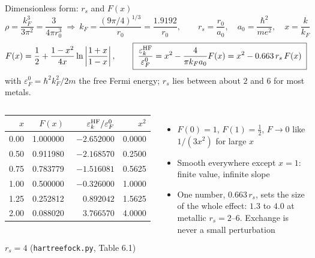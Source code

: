 \documentclass[aspectratio=169,10pt]{beamer}
\begin{document}
\begin{frame}{Dimensionless form: $r_s$ and $F(x)$}
  \small
  \[
    \rho=\frac{k_F^3}{3\pi^2}=\frac{3}{4\pi r_0^3}\ \Rightarrow\ k_F=\frac{(9\pi/4)^{1/3}}{r_0}=\frac{1.9192}{r_0},
    \qquad r_s=\frac{r_0}{a_0},\quad a_0=\frac{\hbar^2}{me^2},\quad x=\frac{k}{k_F}
  \]
  \vspace{-1.0em}
  \[
    F(x)=\frac12+\frac{1-x^2}{4x}\ln\left|\frac{1+x}{1-x}\right|,
    \qquad
    \boxed{\;\frac{\varepsilon_k^{\rm HF}}{\varepsilon_F^0}=x^2-\frac{4}{\pi k_Fa_0}F(x)=x^2-0.663\,r_s\,F(x)\;}
  \]
  with $\varepsilon_F^0=\hbar^2k_F^2/2m$ the free Fermi energy; $r_s$ lies between about $2$ and $6$ for most metals.
  \begin{columns}[T]
    \begin{center}\small
    \begin{tabular}{@{}rrrr@{}}\toprule
    $x$ & $F(x)$ & $\varepsilon^{\rm HF}_k/\varepsilon_F^0$ & $x^2$\\\midrule
    0.00 & 1.000000 & $-2.652000$ & 0.0000\\
    0.50 & 0.911980 & $-2.168570$ & 0.2500\\
    0.75 & 0.783779 & $-1.516081$ & 0.5625\\
    1.00 & 0.500000 & $-0.326000$ & 1.0000\\
    1.25 & 0.252812 & $\phantom{-}0.892042$ & 1.5625\\
    2.00 & 0.088020 & $\phantom{-}3.766570$ & 4.0000\\\bottomrule
    \end{tabular}\\[2pt]
    $r_s=4$ (\texttt{hartreefock.py}, Table 6.1)
    \end{center}
    \begin{itemize}
      \item $F(0)=1$, $F(1)=\tfrac12$, $F\to0$ like $1/(3x^2)$ for large $x$
      \item Smooth everywhere except $x=1$: finite value, \alert{infinite slope}
      \item One number, $0.663\,r_s$, sets the size of the whole effect: $1.3$ to $4.0$ at metallic $r_s=2$--$6$. Exchange is never a small perturbation
    \end{itemize}
  \end{columns}
\end{frame}
\end{document}
